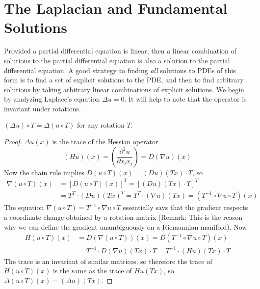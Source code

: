 \section{The Laplacian and Fundamental Solutions}

Provided a partial differential equation is linear, then a linear combination of solutions to the partial differential equation is also a solution to the partial differential equation. A good strategy to finding {\it all} solutions to PDEs of this form is to find a set of explicit solutions to the PDE, and then to find arbitrary solutions by taking arbitrary linear combinations of explicit solutions. We begin by analyzing Laplace's equation $\Delta u = 0$. It will help to note that the operator is invariant under rotations.

\begin{theorem}
    $(\Delta u) \circ T = \Delta (u \circ T)$ for any rotation $T$.
\end{theorem}
\begin{proof}
    $\Delta u(x)$ is the trace of the Hessian operator
    \[ (Hu)(x) = \left( \frac{\partial^2 u}{\partial x_ix_j} \right) = D(\nabla u)(x) \]
    Now the chain rule implies $D(u \circ T)(x) = (Du)(Tx) \cdot T$, so
    \begin{align*}
        \nabla (u \circ T)(x) &= [D(u \circ T)(x)]^T = [(Du)(Tx) \cdot T]^T\\
        &= T^T \cdot (Du)(Tx)^T = T^T \cdot (\nabla u)(Tx) = (T^{-1} \circ \nabla u \circ T)(x)
    \end{align*}
    The equation $\nabla (u \circ T) = T^{-1} \circ \nabla u \circ T$ essentially says that the gradient respects a coordinate change obtained by a rotation matrix (Remark: This is the reason why we can define the gradient unambiguously on a Riemannian manifold). Now
    \begin{align*}
        H(u \circ T)(x) &= D(\nabla (u \circ T))(x) = D(T^{-1} \circ \nabla u \circ T)(x)\\
        &= T^{-1} \cdot D(\nabla u)(Tx) \cdot T = T^{-1} \cdot (Hu)(Tx) \cdot T
    \end{align*}
    The trace is an invariant of similar matrices, so therefore the trace of $H(u \circ T)(x)$ is the same as the trace of $Hu(Tx)$, so $\Delta (u \circ T)(x) = (\Delta u)(Tx)$.
\end{proof}

